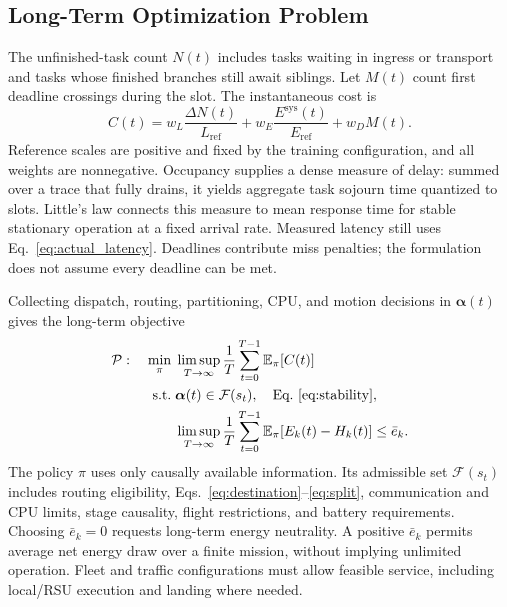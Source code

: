 \documentclass[journal]{IEEEtran}
\begin{document}
\subsection{Long-Term Optimization Problem}
\label{subsec:problem_formulation}
The unfinished-task count $N(t)$ includes tasks waiting in ingress or transport and tasks whose finished branches still await siblings. Let $M(t)$ count first deadline crossings during the slot. The instantaneous cost is
\begin{equation}
C(t)=w_L\frac{\Delta N(t)}{L_{\mathrm{ref}}}
 +w_E\frac{E^{\mathrm{sys}}(t)}{E_{\mathrm{ref}}}+w_DM(t).
\label{eq:cost}
\end{equation}
Reference scales are positive and fixed by the training configuration, and all weights are nonnegative. Occupancy supplies a dense measure of delay: summed over a trace that fully drains, it yields aggregate task sojourn time quantized to slots. Little's law connects this measure to mean response time for stable stationary operation at a fixed arrival rate. Measured latency still uses Eq.~\eqref{eq:actual_latency}. Deadlines contribute miss penalties; the formulation does not assume every deadline can be met.

Collecting dispatch, routing, partitioning, CPU, and motion decisions in $\boldsymbol\alpha(t)$ gives the long-term objective
\begin{equation}
\begin{aligned}
\mathcal P:\quad \min_{\pi}\;&\limsup_{T\to\infty}\frac1T
 \sum_{t=0}^{T-1}\mathbb E_\pi[C(t)]\\
\mathrm{s.t.}\;&\boldsymbol\alpha(t)\in\mathcal F(s_t),
 \quad\text{Eq.~\eqref{eq:stability}},\\
&\limsup_{T\to\infty}\frac1T\sum_{t=0}^{T-1}
 \mathbb E_\pi[E_k(t)-H_k(t)]\le\bar e_k.
\end{aligned}
\label{eq:problem}
\end{equation}
The policy $\pi$ uses only causally available information. Its admissible set $\mathcal F(s_t)$ includes routing eligibility, Eqs.~\eqref{eq:destination}--\eqref{eq:split}, communication and CPU limits, stage causality, flight restrictions, and battery requirements. Choosing $\bar e_k=0$ requests long-term energy neutrality. A positive $\bar e_k$ permits average net energy draw over a finite mission, without implying unlimited operation. Fleet and traffic configurations must allow feasible service, including local/RSU execution and landing where needed.

\fi
\end{document}
